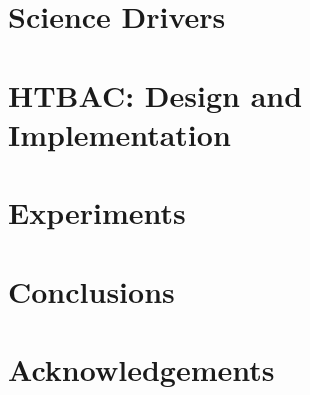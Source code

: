 \documentclass{llncs}
\begin{document}
\section{Science Drivers}
\label{sec:science-drivers}



\section{HTBAC: Design and Implementation}


\section{Experiments}


%

\section{Conclusions}
%

\section{Acknowledgements}
%

\newpage



\end{document}
